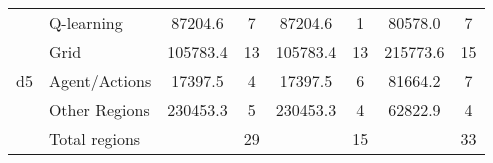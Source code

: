 \begin{tabular}{ c l | cc | cc | cc }
\midrule
\multirow{5}{*}{d5} & Q-learning 	& 87204.6&7 	&87204.6&1 		&80578.0&7\\
& Grid 					& 105783.4&13 	&105783.4&13 	&215773.6&15 \\
& Agent/Actions 				& 17397.5&4 	&17397.5&6 		&81664.2&7\\
& Other Regions	 			& 230453.3&5 	&230453.3&4 	&62822.9&4\\
& Total regions 				& &29 		&&15 			&&33\\

\midrule
%
%
%

\end{tabular}
